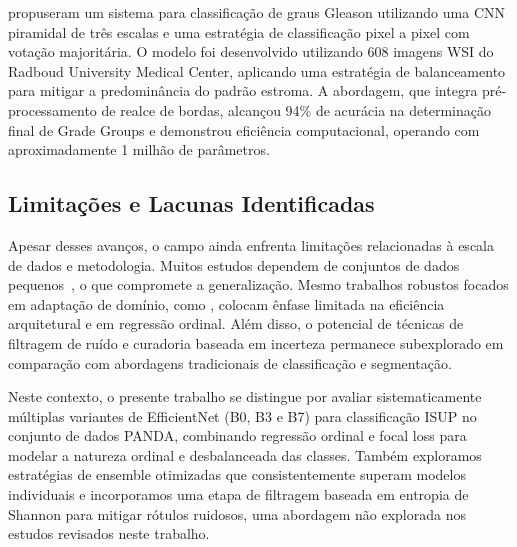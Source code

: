 \cite{ref-hammouda2021} propuseram um sistema para classificação de graus Gleason utilizando uma CNN piramidal de três escalas e uma estratégia de classificação pixel a pixel com votação majoritária. O modelo foi desenvolvido utilizando 608 imagens WSI do Radboud University Medical Center, aplicando uma estratégia de balanceamento para mitigar a predominância do padrão estroma. A abordagem, que integra pré-processamento de realce de bordas, alcançou 94\% de acurácia na determinação final de Grade Groups e demonstrou eficiência computacional, operando com aproximadamente 1 milhão de parâmetros.

\subsection{Limitações e Lacunas Identificadas}

Apesar desses avanços, o campo ainda enfrenta limitações relacionadas à escala de dados e metodologia. Muitos estudos dependem de conjuntos de dados pequenos~\cite{ref-kott2019,ref-lucas2019}, o que compromete a generalização. Mesmo trabalhos robustos focados em adaptação de domínio, como \cite{ref-singhal2022}, colocam ênfase limitada na eficiência arquitetural e em regressão ordinal. Além disso, o potencial de técnicas de filtragem de ruído e curadoria baseada em incerteza permanece subexplorado em comparação com abordagens tradicionais de classificação e segmentação.

Neste contexto, o presente trabalho se distingue por avaliar sistematicamente múltiplas variantes de EfficientNet (B0, B3 e B7) para classificação ISUP no conjunto de dados PANDA, combinando regressão ordinal e focal loss para modelar a natureza ordinal e desbalanceada das classes. Também exploramos estratégias de ensemble otimizadas que consistentemente superam modelos individuais e incorporamos uma etapa de filtragem baseada em entropia de Shannon para mitigar rótulos ruidosos, uma abordagem não explorada nos estudos revisados neste trabalho.

